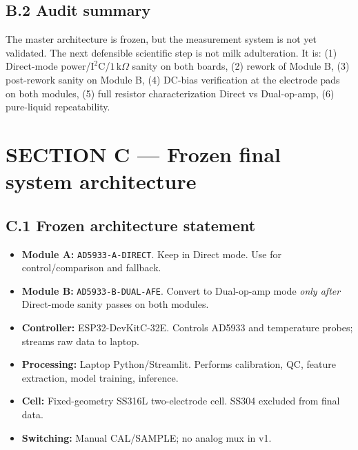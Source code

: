 \documentclass[11pt,a4paper]{article}
\newcommand{\kohm}[1]{\ensuremath{#1\,\mathrm{k}\Omega}}
\begin{document}
\subsection{B.2 Audit summary}

\begin{rulebox}
The master architecture is frozen, but the measurement system is not yet validated. The next defensible scientific step is not milk adulteration. It is: (1) Direct-mode power/$\mathrm{I^2C}$/\kohm{1} sanity on both boards, (2) rework of Module B, (3) post-rework sanity on Module B, (4) DC-bias verification at the electrode pads on both modules, (5) full resistor characterization Direct vs Dual-op-amp, (6) pure-liquid repeatability.
\end{rulebox}

\section{SECTION C --- Frozen final system architecture}
\label{sec:C}

\subsection{C.1 Frozen architecture statement}

\begin{itemize}
\item \textbf{Module A:} \texttt{AD5933-A-DIRECT}. Keep in Direct mode. Use for control/comparison and fallback.
\item \textbf{Module B:} \texttt{AD5933-B-DUAL-AFE}. Convert to Dual-op-amp mode \emph{only after} Direct-mode sanity passes on both modules.
\item \textbf{Controller:} ESP32-DevKitC-32E. Controls AD5933 and temperature probes; streams raw data to laptop.
\item \textbf{Processing:} Laptop Python/Streamlit. Performs calibration, QC, feature extraction, model training, inference.
\item \textbf{Cell:} Fixed-geometry SS316L two-electrode cell. SS304 excluded from final data.
\item \textbf{Switching:} Manual CAL/SAMPLE; no analog mux in v1.
\end{itemize}
\end{document}
